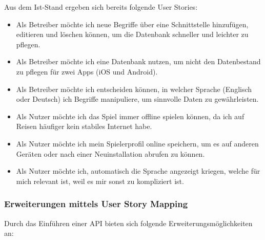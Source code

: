 {Aus dem Ist-Stand ergeben sich bereits folgende User Stories: 

\begin{itemize}
	\item Als Betreiber möchte ich neue Begriffe über eine Schnittstelle hinzufügen, editieren und löschen können, um die Datenbank schneller und leichter zu pflegen.
	\item Als Betreiber möchte ich eine Datenbank nutzen, um nicht den Datenbestand zu pflegen für zwei Apps (iOS und Android).
	\item Als Betreiber möchte ich entscheiden können, in welcher Sprache (Englisch oder Deutsch) ich Begriffe manipuliere, um sinnvolle Daten zu gewährleisten.
	\item Als Nutzer möchte ich das Spiel immer offline spielen können, da ich auf Reisen häufiger kein stabiles Internet habe.
	\item Als Nutzer möchte ich mein Spielerprofil online speichern, um es auf anderen Geräten oder nach einer Neuinstallation abrufen zu können.
	\item Als Nutzer möchte ich, automatisch die Sprache angezeigt kriegen, welche für mich relevant ist, weil es mir sonst zu kompliziert ist.
\end{itemize}

\subsubsection{Erweiterungen mittels User Story Mapping}

Durch das Einführen einer API bieten sich folgende Erweiterungsmöglichkeiten an:

}
